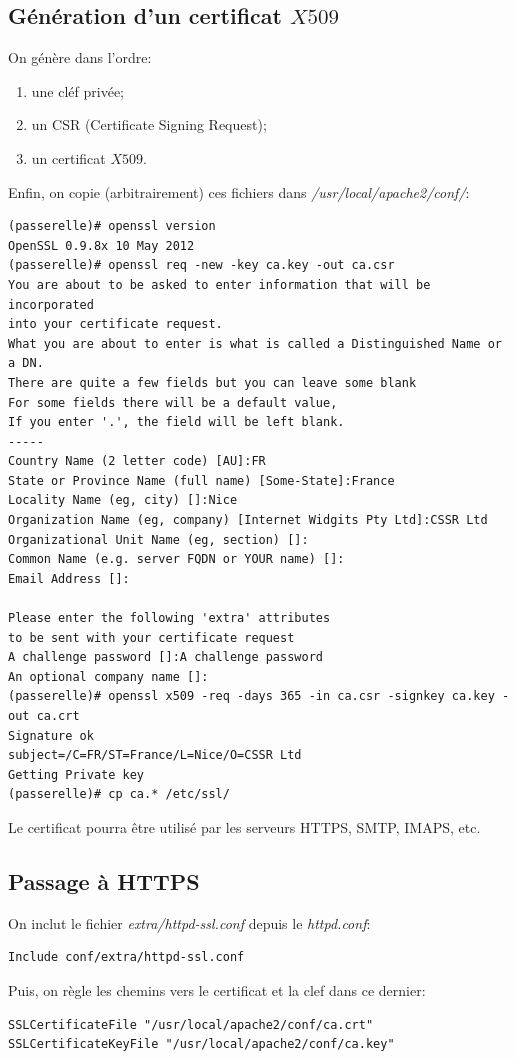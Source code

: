 \documentclass[a4paper]{article}
\begin{document}
\subsection{Génération d'un certificat $X509$}
On génère dans l'ordre:
\begin{enumerate}
	\item une cléf privée;
	\item un CSR (Certificate Signing Request);
	\item un certificat $X509$.
\end{enumerate}

Enfin, on copie (arbitrairement) ces fichiers dans
\textit{/usr/local/apache2/conf/}:
\begin{verbatim}
(passerelle)# openssl version
OpenSSL 0.9.8x 10 May 2012
(passerelle)# openssl req -new -key ca.key -out ca.csr
You are about to be asked to enter information that will be incorporated
into your certificate request.
What you are about to enter is what is called a Distinguished Name or a DN.
There are quite a few fields but you can leave some blank
For some fields there will be a default value,
If you enter '.', the field will be left blank.
-----
Country Name (2 letter code) [AU]:FR
State or Province Name (full name) [Some-State]:France
Locality Name (eg, city) []:Nice
Organization Name (eg, company) [Internet Widgits Pty Ltd]:CSSR Ltd
Organizational Unit Name (eg, section) []:
Common Name (e.g. server FQDN or YOUR name) []:
Email Address []:

Please enter the following 'extra' attributes
to be sent with your certificate request
A challenge password []:A challenge password
An optional company name []:
(passerelle)# openssl x509 -req -days 365 -in ca.csr -signkey ca.key -out ca.crt
Signature ok
subject=/C=FR/ST=France/L=Nice/O=CSSR Ltd
Getting Private key
(passerelle)# cp ca.* /etc/ssl/
\end{verbatim}

Le certificat pourra être utilisé par les serveurs HTTPS, SMTP, IMAPS, etc.

\subsection{Passage à HTTPS}
On inclut le fichier \textit{extra/httpd-ssl.conf} depuis le
\textit{httpd.conf}:
\begin{verbatim}
Include conf/extra/httpd-ssl.conf
\end{verbatim}

Puis, on règle les chemins vers le certificat et la clef dans ce
dernier:
\begin{verbatim}
SSLCertificateFile "/usr/local/apache2/conf/ca.crt"
SSLCertificateKeyFile "/usr/local/apache2/conf/ca.key"
\end{verbatim}
\end{document}
